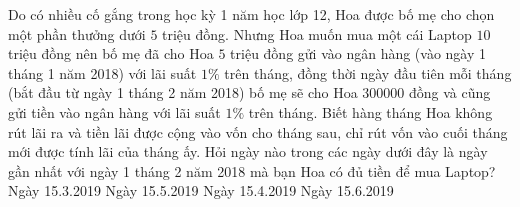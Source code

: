 \begin{ex}%
	Do có nhiều cố gắng trong học kỳ 1 năm học lớp 12, Hoa được bố mẹ cho chọn một phần thưởng dưới $5$ triệu đồng. Nhưng Hoa muốn mua một cái Laptop $10$ triệu đồng nên bố mẹ đã cho Hoa $5$ triệu đồng gửi vào ngân hàng (vào ngày 1 tháng 1 năm 2018) với lãi suất $1\%$ trên tháng, đồng thời ngày đầu tiên mỗi tháng (bắt đầu từ ngày 1 tháng 2 năm 2018) bố mẹ sẽ cho Hoa $300000$ đồng và cũng gửi tiền vào ngân hàng với lãi suất $1\%$ trên tháng. Biết hàng tháng Hoa không rút lãi ra và tiền lãi được cộng vào vốn cho tháng sau, chỉ rút vốn vào cuối tháng mới được tính lãi của tháng ấy. Hỏi ngày nào trong các ngày dưới đây là ngày gần nhất với ngày 1 tháng 2 năm 2018 mà bạn Hoa có đủ tiền để mua Laptop?
	\choice
	{\True Ngày 15.3.2019	}
	{Ngày 15.5.2019	}
	{Ngày 15.4.2019	}
	{Ngày 15.6.2019 }
\end{ex}
